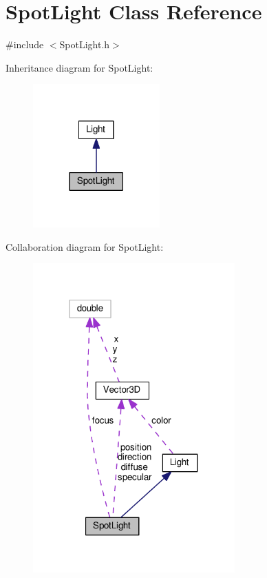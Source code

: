 \hypertarget{classSpotLight}{}\section{Spot\+Light Class Reference}
\label{classSpotLight}


{\ttfamily \#include $<$Spot\+Light.\+h$>$}



Inheritance diagram for Spot\+Light\+:\nopagebreak
\begin{figure}[H]
\begin{center}
\leavevmode
\includegraphics[width=138pt]{classSpotLight__inherit__graph}
\end{center}
\end{figure}


Collaboration diagram for Spot\+Light\+:\nopagebreak
\begin{figure}[H]
\begin{center}
\leavevmode
\includegraphics[width=220pt]{classSpotLight__coll__graph}
\end{center}
\end{figure}
